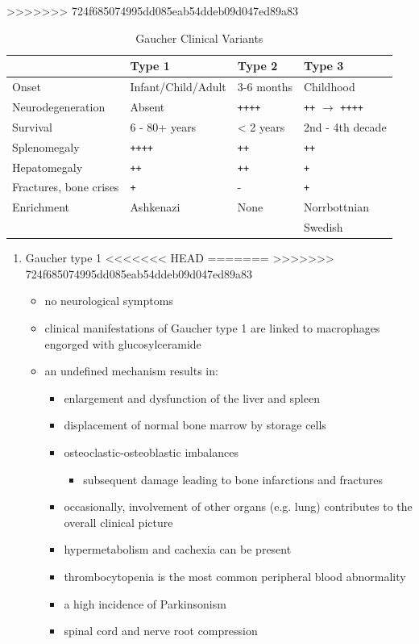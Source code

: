 \documentclass[fontsize=12pt]{scrartcl}
\begin{document}
\begin{enumerate}
\begin{enumerate}
\begin{enumerate}
\begin{enumerate}
\begin{table}[htbp]
\begin{enumerate}
\begin{enumerate}
\begin{table}[htbp]
\begin{table}[htbp]
\caption{\label{tab:org7a1b7ec}
Gaucher Clinical Variants}
>>>>>>> 724f685074995dd085eab54ddeb09d047ed89a83
\centering
\begin{tabular}{llll}
 & Type 1 & Type 2 & Type 3\\
\hline
Onset & Infant/Child/Adult & 3-6 months & Childhood\\
Neurodegeneration & Absent & \texttt{++++} & \texttt{++} \(\to\) \texttt{++++}\\
Survival & 6 - 80+ years & < 2 years & 2nd - 4th decade\\
Splenomegaly & \texttt{++++} & \texttt{++} & \texttt{++}\\
Hepatomegaly & \texttt{++} & \texttt{++} & \texttt{+}\\
Fractures, bone crises & \texttt{+} & - & \texttt{+}\\
Enrichment & Ashkenazi & None & Norrbottnian\\
 &  &  & Swedish\\
\end{tabular}
\end{table}

\begin{enumerate}
\item Gaucher type 1
<<<<<<< HEAD
\label{sec:orgf3e776e}
=======
\label{sec:org7047a04}
>>>>>>> 724f685074995dd085eab54ddeb09d047ed89a83
\begin{itemize}
\item no neurological symptoms
\item clinical manifestations of Gaucher type 1 are linked to macrophages
engorged with glucosylceramide

\item an undefined mechanism results in:
\begin{itemize}
\item enlargement and dysfunction of the liver and spleen
\item displacement of normal bone marrow by storage cells
\item osteoclastic-osteoblastic imbalances
\begin{itemize}
\item subsequent damage leading to bone infarctions and fractures
\end{itemize}
\item occasionally, involvement of other organs (e.g. lung) contributes
to the overall clinical picture
\item hypermetabolism and cachexia can be present
\item thrombocytopenia is the most common peripheral blood abnormality
\item a high incidence of Parkinsonism
\item spinal cord and nerve root compression
\end{itemize}
\end{itemize}


\end{enumerate}
\end{table}
\end{enumerate}
\end{enumerate}
\end{table}
\end{enumerate}
\end{enumerate}
\end{enumerate}
\end{enumerate}
\end{document}

